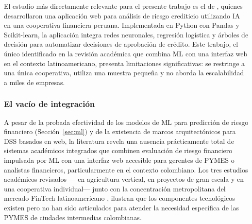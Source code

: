 \documentclass[12pt, letterpaper]{article}
\begin{document}
El estudio m\'as directamente relevante para el presente trabajo es el de \citet{MayorgaLira2023}, quienes desarrollaron una aplicaci\'on web para an\'alisis de riesgo crediticio utilizando IA en una cooperativa financiera peruana. Implementada en Python con Pandas y Scikit-learn, la aplicaci\'on integra redes neuronales, regresi\'on log\'istica y \'arboles de decisi\'on para automatizar decisiones de aprobaci\'on de cr\'edito. Este trabajo, el \'unico identificado en la revisi\'on acad\'emica que combina ML con una interfaz web en el contexto latinoamericano, presenta limitaciones significativas: se restringe a una \'unica cooperativa, utiliza una muestra peque\~na y no aborda la escalabilidad a miles de empresas.

\subsubsection{El vac\'io de integraci\'on}

A pesar de la probada efectividad de los modelos de ML para predicci\'on de riesgo financiero (Secci\'on~\ref{sec:ml}) y de la existencia de marcos arquitect\'onicos para DSS basados en web, la literatura revela una ausencia pr\'acticamente total de sistemas acad\'emicos integrados que combinen evaluaci\'on de riesgo financiero impulsada por ML con una interfaz web accesible para gerentes de PYMES o analistas financieros, particularmente en el contexto colombiano. Los tres estudios acad\'emicos revisados ---\citet{BaumontDeOliveira2021} en agricultura vertical, \citet{Sholapurapu2024} en proyectos de gran escala y \citet{MayorgaLira2023} en una cooperativa individual--- junto con la concentraci\'on metropolitana del mercado FinTech latinoamericano \citep{Ioannou2022}, ilustran que los componentes tecnol\'ogicos existen pero no han sido articulados para atender la necesidad espec\'ifica de las PYMES de ciudades intermedias colombianas.
\end{document}
